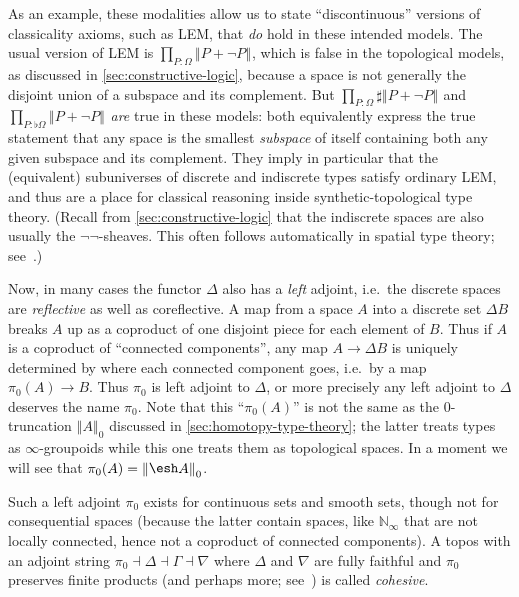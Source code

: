 \documentclass[12pt]{article}
\def\oo{\ensuremath{\infty}}
\def\N{\mathbb{N}}
\numberwithin{equation}{section}
\newcommand{\trunc}[2]{\mathopen{}\left\Vert #2\right\Vert_{#1}\mathclose{}}
\newcommand{\brck}[1]{\trunc{}{#1}}
\newcommand{\shape}{\ensuremath{\mathord{\raisebox{0.5pt}{\text{\rm\esh}}}}}
\begin{document}
As an example, these modalities allow us to state ``discontinuous'' versions of classicality axioms, such as LEM, that \emph{do} hold in these intended models.
The usual version of LEM is $\prod_{P:\Omega} \brck{P + \neg P}$, which is false in the topological models, as discussed in \cref{sec:constructive-logic}, because a space is not generally the disjoint union of a subspace and its complement.
But $\prod_{P:\Omega} \sharp\brck{P + \neg P}$ and $\prod_{P:\flat\Omega} \brck{P + \neg P}$ \emph{are} true in these models: both equivalently express the true statement that any space is the smallest \emph{subspace} of itself containing both any given subspace and its complement.
They imply in particular that the (equivalent) subuniverses of discrete and indiscrete types satisfy ordinary LEM, and thus are a place for classical reasoning inside synthetic-topological type theory.
(Recall from \cref{sec:constructive-logic} that the indiscrete spaces are also usually the $\neg\neg$-sheaves.
This often follows automatically in spatial type theory; see~\cite{shulman:bfp-realcohesion}.)

Now, in many cases the functor $\Delta$ also has a \emph{left} adjoint, i.e.\ the discrete spaces are \emph{reflective} as well as coreflective.
A map from a space $A$ into a discrete set $\Delta B$ breaks $A$ up as a coproduct of one disjoint piece for each element of $B$.
Thus if $A$ is a coproduct of ``connected components'', any map $A\to \Delta B$ is uniquely determined by where each connected component goes, i.e.\ by a map $\pi_0(A)\to B$.
Thus $\pi_0$ is left adjoint to $\Delta$, or more precisely any left adjoint to $\Delta$ deserves the name $\pi_0$.
Note that this ``$\pi_0(A)$'' is not the same as the $0$-truncation $\trunc 0 A$ discussed in \cref{sec:homotopy-type-theory}; the latter treats types as \oo-groupoids while this one treats them as topological spaces.
In a moment we will see that $\pi_0(A) = \trunc 0{\shape A}$.

Such a left adjoint $\pi_0$ exists for continuous sets and smooth sets, though not for consequential spaces (because the latter contain spaces, like $\N_\oo$ that are not locally connected, hence not a coproduct of connected components).
A topos with an adjoint string $\pi_0\dashv \Delta\dashv \Gamma\dashv \nabla$ where $\Delta$ and $\nabla$ are fully faithful and $\pi_0$ preserves finite products (and perhaps more; see~\cite{lawvere:cohesion,johnstone:punctual-lc,shulman:bfp-realcohesion}) is called \emph{cohesive}.
\end{document}
